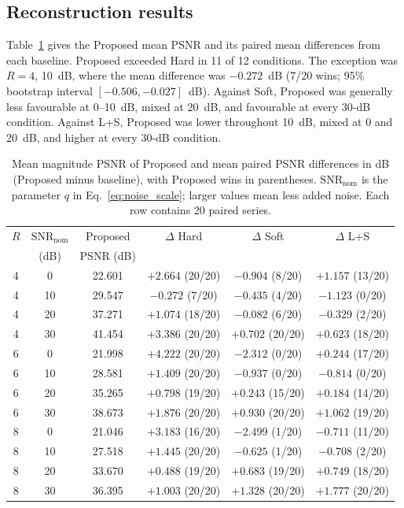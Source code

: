 \subsection{Reconstruction results}
\label{sec:evaluation_results}

Table~\ref{tab:single_image_psnr} gives the Proposed mean PSNR and its paired mean differences from each baseline. Proposed exceeded Hard in 11 of 12 conditions. The exception was $R=4$, 10~dB, where the mean difference was $-0.272$~dB (7/20 wins; 95\% bootstrap interval $[-0.506,-0.027]$~dB). Against Soft, Proposed was generally less favourable at 0--10~dB, mixed at 20~dB, and favourable at every 30-dB condition. Against L+S, Proposed was lower throughout 10~dB, mixed at 0 and 20~dB, and higher at every 30-dB condition.

\begin{table}[t]
\centering
\caption{Mean magnitude PSNR of Proposed and mean paired PSNR differences in dB (Proposed minus baseline), with Proposed wins in parentheses. $\mathrm{SNR}_{\mathrm{nom}}$ is the parameter $q$ in Eq.~\eqref{eq:noise_scale}; larger values mean less added noise. Each row contains 20 paired series.}
\label{tab:single_image_psnr}
\small
\setlength{\tabcolsep}{3.2pt}
\begin{tabular}{cccccc}
\toprule
$R$ & $\mathrm{SNR}_{\mathrm{nom}}$ & Proposed & $\Delta$ Hard & $\Delta$ Soft & $\Delta$ L+S \\
 & (dB) & PSNR (dB) & & & \\
\midrule
4 & 0  & 22.601 & $+2.664$ (20/20) & $-0.904$ (8/20)  & $+1.157$ (13/20) \\
4 & 10 & 29.547 & $-0.272$ (7/20)  & $-0.435$ (4/20)  & $-1.123$ (0/20) \\
4 & 20 & 37.271 & $+1.074$ (18/20) & $-0.082$ (6/20)  & $-0.329$ (2/20) \\
4 & 30 & 41.454 & $+3.386$ (20/20) & $+0.702$ (20/20) & $+0.623$ (18/20) \\
6 & 0  & 21.998 & $+4.222$ (20/20) & $-2.312$ (0/20)  & $+0.244$ (17/20) \\
6 & 10 & 28.581 & $+1.409$ (20/20) & $-0.937$ (0/20)  & $-0.814$ (0/20) \\
6 & 20 & 35.265 & $+0.798$ (19/20) & $+0.243$ (15/20) & $+0.184$ (14/20) \\
6 & 30 & 38.673 & $+1.876$ (20/20) & $+0.930$ (20/20) & $+1.062$ (19/20) \\
8 & 0  & 21.046 & $+3.183$ (16/20) & $-2.499$ (1/20)  & $-0.711$ (11/20) \\
8 & 10 & 27.518 & $+1.445$ (20/20) & $-0.625$ (1/20)  & $-0.708$ (2/20) \\
8 & 20 & 33.670 & $+0.488$ (19/20) & $+0.683$ (19/20) & $+0.749$ (18/20) \\
8 & 30 & 36.395 & $+1.003$ (20/20) & $+1.328$ (20/20) & $+1.777$ (20/20) \\
\bottomrule
\end{tabular}
\end{table}

